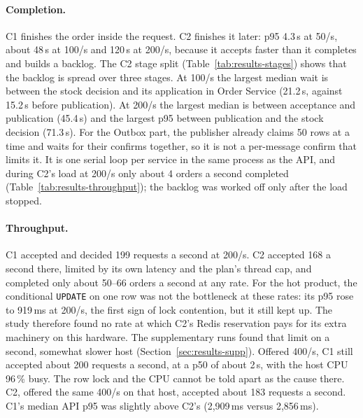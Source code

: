\documentclass[a4paper]{report}
\begin{document}
\paragraph{Completion.} C1 finishes the order inside the request. C2 finishes
it later: p95 4.3\,s at 50/s, about 48\,s at 100/s and 120\,s at 200/s,
because it accepts faster than it completes and builds a backlog. The C2 stage
split (Table~\ref{tab:results-stages}) shows that the backlog is spread over
three stages. At 100/s the largest median wait is between the stock decision
and its application in Order Service (21.2\,s, against 15.2\,s before
publication). At 200/s the largest median is between acceptance and
publication (45.4\,s) and the largest p95 between publication and the stock
decision (71.3\,s). For the Outbox part, the publisher already
claims 50 rows at a time and waits for their confirms together, so it is not
a per-message confirm that limits it. It is one serial loop per service in
the same process as the API, and during C2's load at 200/s only about 4
orders a second completed (Table~\ref{tab:results-throughput}); the backlog
was worked off only after the load stopped.

\paragraph{Throughput.} C1 accepted and decided 199 requests a second at
200/s. C2 accepted 168 a second there, limited by its own latency and the
plan's thread cap, and completed only about 50--66 orders a second at any rate.
For the hot product, the conditional \texttt{UPDATE} on one row was not the
bottleneck at these rates: its p95 rose to 919\,ms at 200/s, the first sign of
lock contention, but it still kept up. The study therefore found no rate at
which C2's Redis reservation pays for its extra machinery on this hardware.
The supplementary runs found that limit on a second, somewhat slower host
(Section~\ref{sec:results-supp}). Offered 400/s, C1 still accepted about 200
requests a second, at a p50 of about 2\,s, with the host CPU 96\,\% busy. The
row lock and the CPU cannot be told apart as the cause there. C2, offered the
same 400/s on that host, accepted about 183 requests a second. C1's median
API p95 was slightly above C2's (2,909\,ms versus 2,856\,ms).
\end{document}

